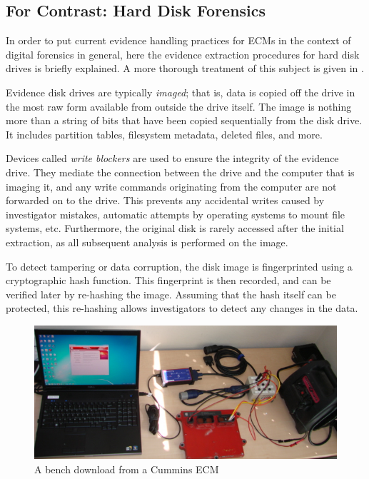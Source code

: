 \subsection{For Contrast: Hard Disk Forensics}

In order to put current evidence handling practices for ECMs in the context of digital forensics in general, here the evidence extraction
procedures for hard disk drives is briefly explained. A more thorough treatment of this subject is given in \cite{carrier2005}.

Evidence disk drives are typically \emph{imaged}; that is, data is copied off the drive in the most raw form available from outside
the drive itself. The image is nothing more than a string of bits that have been copied sequentially from the disk drive. It includes
partition tables, filesystem metadata, deleted files, and more.

Devices called \emph{write blockers} are used to ensure the integrity of the evidence drive. They mediate the connection between the
drive and the computer that is imaging it, and any write commands originating from the computer are not forwarded on to the drive.
This prevents any accidental writes caused by investigator mistakes, automatic attempts by operating systems to mount file systems, etc.
Furthermore, the original disk is rarely accessed after the initial extraction, as all subsequent analysis is performed on the image.

To detect tampering or data corruption, the disk image is fingerprinted using a cryptographic hash function. This fingerprint is then recorded,
and can be verified later by re-hashing the image. Assuming that the hash itself can be protected, this re-hashing allows investigators to
detect any changes in the data.

\begin{figure}[h]

  \includegraphics[scale=0.5]{cumminsbench}
  \caption{A bench download from a Cummins ECM}
  \label{fig:cumminsbench}
\end{figure}

